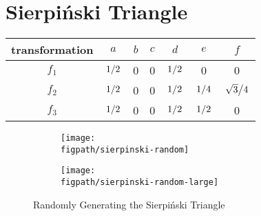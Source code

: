 \documentclass[12pt,a4paper]{article}
\newcommand{\figpath}{../fig}
\begin{document}
    \section{Sierpiński Triangle}
    \begin{table}
        \centering
        \begin{tabular}{|c|c|c|c|c|c|c|}
            \hline
            transformation & $a$ & $b$ & $c$ & $d$ & $e$ & $f$ \\
            \hline
            $f_1$ & $\flatfrac{1}{2}$ & 0 & 0 & $\flatfrac{1}{2}$ & 0 & 0 \\
            \hline
            $f_2$ & $\flatfrac{1}{2}$ & 0 & 0 & $\flatfrac{1}{2}$ & $\flatfrac{1}{4}$ & $\flatfrac{\sqrt{3}}{4}$ \\
            \hline
            $f_3$ & $\flatfrac{1}{2}$ & 0 & 0 & $\flatfrac{1}{2}$ & $\flatfrac{1}{2}$ & 0 \\
            \hline
        \end{tabular}
    \end{table}
    \begin{figure}
        \centering
        \begin{subfigure}{\linewidth}
            \centering
        \end{subfigure}
        \begin{subfigure}{\linewidth}
            \centering
        \end{subfigure}
    \end{figure}
    \thispagestyle{empty}
    \begin{figure}
        \centering
        \begin{subfigure}{\linewidth}
            \centering
            \texttt{[image: \\figpath/sierpinski-random]}
        \end{subfigure}
        \begin{subfigure}{\linewidth}
            \centering
            \texttt{[image: \\figpath/sierpinski-random-large]}
        \end{subfigure}
        \caption{Randomly Generating the Sierpiński Triangle}
    \end{figure}
    \FloatBarrier
    \restoregeometry
\end{document}
